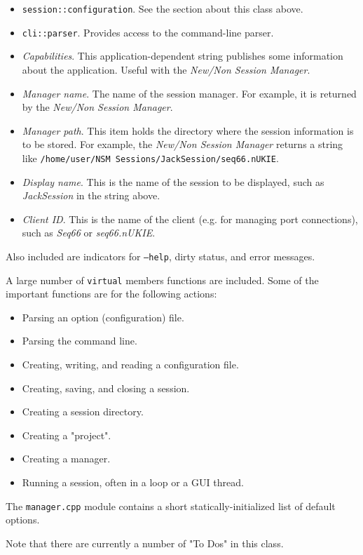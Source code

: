    \begin{itemize}
      \item \texttt{session::configuration}.
         See the section about this class above.
      \item \texttt{cli::parser}.
         Provides access to the command-line parser.
      \item \textsl{Capabilities}.
         This application-dependent string publishes some information about
         the application. Useful with the
         \textsl{New/Non Session Manager}.
      \item \textsl{Manager name}.
         The name of the session manager. For example, it is returned by the
         \textsl{New/Non Session Manager}.
      \item \textsl{Manager path}.
         This item holds the directory where the session information is to
         be stored.
         For example, the \textsl{New/Non Session Manager} returns a string
         like
         \texttt{/home/user/NSM Sessions/JackSession/seq66.nUKIE}.
      \item \textsl{Display name}.
         This is the name of the session to be displayed, such as
         \textsl{JackSession} in the string above.
      \item \textsl{Client ID}.
         This is the name of the client (e.g. for managing port
         connections), such as \textsl{Seq66} or \textsl{seq66.nUKIE}.
   \end{itemize}

   Also included are indicators for \texttt{--help}, dirty status, and error
   messages.

   A large number of \texttt{virtual} members functions are included.
   Some of the important functions are for the following actions:

   \begin{itemize}
      \item Parsing an option (configuration) file.
      \item Parsing the command line.
      \item Creating, writing, and reading a configuration file.
      \item Creating, saving, and closing a session.
      \item Creating a session directory.
      \item Creating a "project".
      \item Creating a manager.
      \item Running a session, often in a loop or a GUI thread.
   \end{itemize}
   
   The \texttt{manager.cpp} module contains a short
   statically-initialized list of
   default options.

   Note that there are currently a number of "To Dos" in this class.

